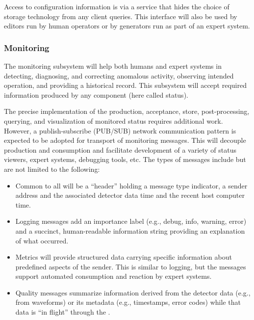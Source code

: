 Access to configuration information is via a service that hides the choice of storage technology from any client queries.
This interface will also be used by editors run by human operators or by  generators run as part of an expert system.

\subsubsection{Monitoring}
\label{sec:daq:design:ccm:monitoring}

The  monitoring subsystem will help both humans and expert systems in detecting, diagnosing, and correcting anomalous activity, observing intended operation, and providing a historical record.
This subsystem will accept required information produced by any  component (here called status).

The precise implementation of the production, acceptance, store, post-processing, querying, and visualization of monitored status requires additional work. 
However, a publish-subscribe (PUB/SUB) network communication pattern is expected to be adopted for transport of monitoring messages. 
This will decouple production and consumption and facilitate development of a variety of status viewers, expert systems, debugging tools, etc. 
The types of messages include but are not limited to the following:

\begin{itemize}
\item Common to all will be a ``header'' holding a message type indicator, a sender address and the associated detector data time and the recent host computer time.
 
\item Logging messages add an importance label (e.g., debug, info, warning, error) and a succinct, human-readable information string providing an explanation of what occurred.
  
\item Metrics will provide structured data carrying specific information about predefined aspects of the sender. 
  This is similar to logging, but the messages support automated consumption and reaction by expert systems.  

\item Quality messages summarize information derived from the detector data (e.g., from waveforms) or its metadata (e.g., timestamps, error codes) while that data is ``in flight'' through the .

\end{itemize}

